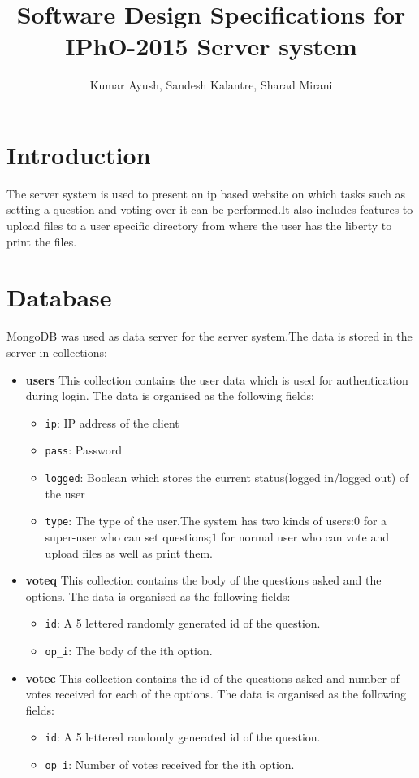 \documentclass[a4paper,10pt]{article}
\title{Software Design Specifications for IPhO-2015 Server system}
\author{Kumar Ayush, Sandesh Kalantre, Sharad Mirani}
\date{}
\begin{document}
\maketitle

\tableofcontents
\section{Introduction}
The server system is used to present an ip based website on which tasks such as
setting a question and voting over it can be performed.It also includes features 
to upload files to a user specific directory from where the user has the liberty to print the
files.

\section{Database}
MongoDB was used as data server for the server system.The data is stored in the server
in collections:
\begin{itemize}
 \item \textbf{users}
 This collection contains the user data which is used for authentication during login.
 The data is organised as the following fields:
 \begin{itemize}
  \item \texttt{ip}: IP address of the client
  \item \texttt{pass}: Password
  \item \texttt{logged}: Boolean which stores the current status(logged in/logged out) of the user
  \item \texttt{type}: The type of the user.The system has two kinds of users:$0$ for a super-user
  who can set questions;$1$ for normal user who can vote and upload files as well as print them.
 \end{itemize}
 \item \textbf{voteq}
 This collection contains the body of the questions asked and the options.
 The data is organised as the following fields:
 \begin{itemize}
  \item \texttt{id}: A 5 lettered randomly generated id of the question.
  \item \texttt{op\_i}: The body of the ith option.
 \end{itemize}
 \item \textbf{votec}
 This collection contains the id of the questions asked and number of votes received for each of the options.
 The data is organised as the following fields:
 \begin{itemize}
  \item \texttt{id}: A 5 lettered randomly generated id of the question.
  \item \texttt{op\_i}: Number of votes received for the ith option.
 \end{itemize}
\end{itemize}
\end{document}
